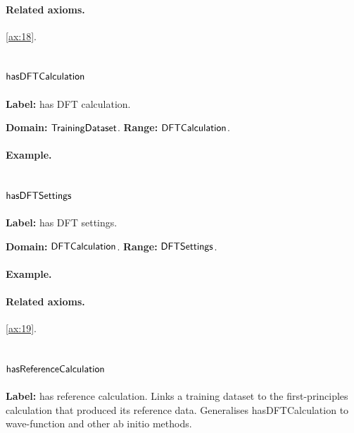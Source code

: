 \paragraph{Related axioms.} \eqref{ax:18}.

\subsection{$\mathsf{hasDFTCalculation}$}
\label{sec:term-hasDFTCalculation}

\textbf{Label:} has DFT calculation.

\textbf{Domain:} $\mathsf{TrainingDataset}$.
\textbf{Range:} $\mathsf{DFTCalculation}$.

\paragraph{Example.}

\subsection{$\mathsf{hasDFTSettings}$}
\label{sec:term-hasDFTSettings}

\textbf{Label:} has DFT settings.

\textbf{Domain:} $\mathsf{DFTCalculation}$.
\textbf{Range:} $\mathsf{DFTSettings}$.

\paragraph{Example.}

\paragraph{Related axioms.} \eqref{ax:19}.

\subsection{$\mathsf{hasReferenceCalculation}$}
\label{sec:term-hasReferenceCalculation}

\textbf{Label:} has reference calculation.
Links a training dataset to the first-principles calculation that produced its reference data. Generalises hasDFTCalculation to wave-function and other ab initio methods.

